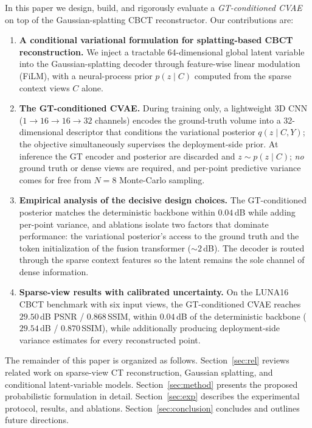 In this paper we design, build, and rigorously evaluate a
\emph{GT-conditioned CVAE} on top of the Gaussian-splatting CBCT
reconstructor. Our contributions are:

\begin{enumerate}
\item \textbf{A conditional variational formulation for splatting-based
CBCT reconstruction.} We inject a tractable 64-dimensional global latent
variable into the Gaussian-splatting decoder through feature-wise linear
modulation (FiLM), with a neural-process prior $p(z\mid C)$ computed from
the sparse context views $C$ alone.

\item \textbf{The GT-conditioned CVAE.} During training only, a
lightweight 3D CNN ($1\to16\to16\to32$ channels) encodes the ground-truth
volume into a 32-dimensional descriptor that conditions the variational
posterior $q(z\mid C,Y)$; the objective simultaneously supervises the
deployment-side prior. At inference the GT encoder and posterior are
discarded and $z\sim p(z\mid C)$; \emph{no} ground truth or dense views are
required, and per-point predictive variance comes for free from $N{=}8$
Monte-Carlo sampling.

\item \textbf{Empirical analysis of the decisive design choices.} The
GT-conditioned posterior matches the deterministic backbone within
$0.04$\,dB while adding per-point variance, and ablations isolate two
factors that dominate performance: the variational posterior's access
to the ground truth and the token initialization of the fusion
transformer ($\sim\!2$\,dB). The decoder is routed through the sparse
context features so the latent remains the sole channel of dense
information.

\item \textbf{Sparse-view results with calibrated uncertainty.} On the
LUNA16 CBCT benchmark with six input views, the GT-conditioned CVAE
reaches $29.50$\,dB PSNR / $0.868$\,SSIM, within $0.04$\,dB of the
deterministic backbone ($29.54$\,dB / $0.870$\,SSIM), while
additionally producing deployment-side variance estimates for every
reconstructed point.
\end{enumerate}

The remainder of this paper is organized as follows. Section~\ref{sec:rel}
reviews related work on sparse-view CT reconstruction, Gaussian splatting,
and conditional latent-variable models. Section~\ref{sec:method} presents
the proposed probabilistic formulation in detail.
Section~\ref{sec:exp} describes the experimental protocol, results, and
ablations. Section~\ref{sec:conclusion} concludes and outlines future
directions.